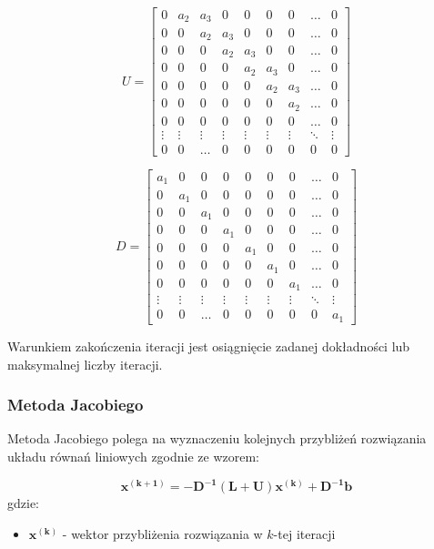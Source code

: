 \documentclass{article}
\begin{document}
\begin{equation}
U = \begin{bmatrix}
    0 & a_2 & a_3 & 0 & 0 & 0 & 0 & \dots & 0\\
    0 & 0 & a_2 & a_3 & 0 & 0 & 0 & \dots & 0\\
    0 & 0 & 0 & a_2 & a_3 & 0 & 0 & \dots & 0\\
    0 & 0 & 0 & 0 & a_2 & a_3 & 0 & \dots & 0\\
    0 & 0 & 0 & 0 & 0 & a_2 & a_3 & \dots & 0\\
    0 & 0 & 0 & 0 & 0 & 0 & a_2 & \dots & 0\\
    0 & 0 & 0 & 0 & 0 & 0 & 0 & \dots & 0\\
    \vdots & \vdots & \vdots & \vdots & \vdots & \vdots & \vdots & \ddots & \vdots\\
    0 & 0 & \dots & 0 & 0 & 0 & 0 & 0 & 0
\end{bmatrix}
\end{equation}

\begin{equation}
D = \begin{bmatrix}
    a_1 & 0 & 0 & 0 & 0 & 0 & 0 & \dots & 0\\
    0 & a_1 & 0 & 0 & 0 & 0 & 0 & \dots & 0\\
    0 & 0 & a_1 & 0 & 0 & 0 & 0 & \dots & 0\\
    0 & 0 & 0 & a_1 & 0 & 0 & 0 & \dots & 0\\
    0 & 0 & 0 & 0 & a_1 & 0 & 0 & \dots & 0\\
    0 & 0 & 0 & 0 & 0 & a_1 & 0 & \dots & 0\\
    0 & 0 & 0 & 0 & 0 & 0 & a_1 & \dots & 0\\
    \vdots & \vdots & \vdots & \vdots & \vdots & \vdots & \vdots & \ddots & \vdots\\
    0 & 0 & \dots & 0 & 0 & 0 & 0 & 0 & a_1
\end{bmatrix}
\end{equation}


Warunkiem zakończenia iteracji jest osiągnięcie
zadanej dokładności lub maksymalnej liczby iteracji.
\subsubsection{Metoda Jacobiego}

Metoda Jacobiego polega na wyznaczeniu kolejnych przybliżeń
rozwiązania układu równań liniowych zgodnie ze wzorem:

\begin{equation}
    \boldsymbol{x^{(k+1)} = -D^{-1}(L + U)x^{(k)} + D^{-1}b}
\end{equation}
gdzie:
\begin{itemize}
    \item $\boldsymbol{x^{(k)}}$ - wektor przybliżenia rozwiązania w $k$-tej iteracji
\end{itemize}
\end{document}
